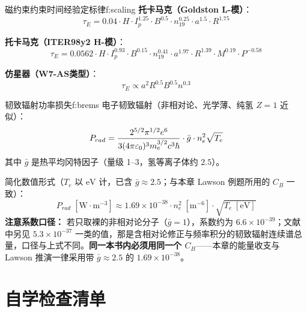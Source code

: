 \begin{formulabox}{磁约束约束时间经验定标律}{f:scaling}
\textbf{托卡马克（Goldston L-模）}：
\[
    \tau_E = 0.04 \cdot H \cdot I_p^{1.25} \cdot B^{0.5} \cdot n_{19}^{0.25} \cdot a^{1.5} \cdot R^{1.75}
\]

\textbf{托卡马克（ITER98y2 H-模）}：
\[
    \tau_E = 0.0562 \cdot H \cdot I_p^{0.93} \cdot B^{0.15} \cdot n_{19}^{0.41} \cdot a^{1.97} \cdot R^{1.39} \cdot M^{0.19} \cdot P^{-0.58}
\]

\textbf{仿星器（W7-AS类型）}：
\[
    \tau_E \propto a^2 R^{0.5} B^{0.5} n^{0.3}
\]
\end{formulabox}

\begin{formulabox}{韧致辐射功率损失}{f:brems}
电子韧致辐射（非相对论、光学薄、纯氢 $Z=1$ 近似）：
\[
    P_{rad} = \frac{2^{5/2}\pi^{1/2}e^6}{3(4\pi\varepsilon_0)^3 m_e^{3/2}c^3\hbar} \cdot \bar{g} \cdot n_e^2 \sqrt{T_e}
\]
其中 $\bar g$ 是热平均冈特因子（量级 1--3，氢等离子体约 $2.5$）。

简化数值形式（$T_e$ 以 $\mathrm{eV}$ 计，已含 $\bar g\approx2.5$；与本章 Lawson 例题所用的 $C_B$ 一致）：
\[
    P_{rad}\;[\mathrm{W\cdot m^{-3}}] \approx 1.69\times10^{-38} \cdot n_e^2\;[\mathrm{m^{-6}}] \cdot \sqrt{T_e\;[\mathrm{eV}]}
\]
\textbf{注意系数口径：} 若只取裸的非相对论分子（$\bar g=1$），系数约为 $6.6\times10^{-39}$；文献中另见 $5.3\times10^{-37}$ 一类的值，那是含相对论修正与频率积分的韧致辐射连续谱总量，口径与上式不同。\textbf{同一本书内必须用同一个 $C_B$}——本章的能量收支与 Lawson 推演一律采用带 $\bar g\approx2.5$ 的 $1.69\times10^{-38}$。
\end{formulabox}


\section{自学检查清单}

